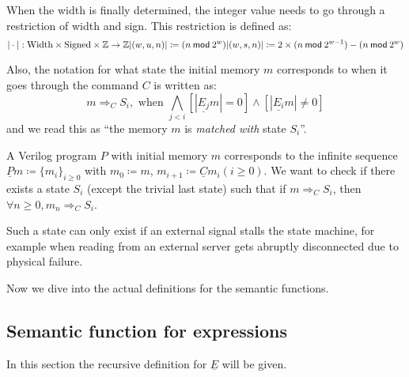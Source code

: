 \documentclass[fleqn]{article}
\theoremstyle{definition}
\begin{document}
When the width is finally determined, the integer value needs to go through a restriction of width and sign. This restriction is defined as:
\[
  |\cdot| : \text{Width}\times\text{Signed}\times\mathbb{Z}\rightarrow\mathbb{Z}\\
  |(w,u,n)| \coloneq (n\:\mathsf{mod}\: 2^{w})\\
  |(w,s,n)| \coloneq 2\times(n\:\mathsf{mod}\: 2^{w-1}) - (n\:\mathsf{mod}\: 2^{w})
\]

Also, the notation for what state the initial memory $m$ corresponds to when it goes through the command $C$ is written as:
\[
  m\Rightarrow_{C} S_{i}, \text{ when }\bigwedge_{j<i}[|\underline{E_{j}}m|=0]\wedge[|\underline{E_{i}}m|\neq 0]
\]
and we read this as ``the memory $m$ is \textit{matched with} state $S_{i}$''.

A Verilog program $P$ with initial memory $m$ corresponds to the infinite sequence $\underline{P}m\coloneq\{m_{i}\}_{i\ge 0}$ with $m_{0}\coloneq m$, $m_{i+1}\coloneq\underline{C}m_{i}(i\ge 0)$. We want to check if there exists a state $S_{i}$ (except the trivial last state) such that if $m\Rightarrow_{C}S_{i}$, then $\forall n\ge 0,m_{n}\Rightarrow_{C}S_{i}$.

Such a state can only exist if an external signal stalls the state machine, for example when reading from an external server gets abruptly disconnected due to physical failure.

Now we dive into the actual definitions for the semantic functions.

\subsection{Semantic function for expressions}
In this section the recursive definition for $\underline{E}$ will be given.
\end{document}
